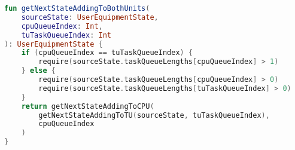 \begin{latin}
	\begin{lstlisting}[language=Kotlin, title=\rl{تابع انتقال حالت با کنش اجرا و ارسال به طور همزمان}]
fun getNextStateAddingToBothUnits(
    sourceState: UserEquipmentState,
    cpuQueueIndex: Int,
    tuTaskQueueIndex: Int
): UserEquipmentState {
	if (cpuQueueIndex == tuTaskQueueIndex) {
		require(sourceState.taskQueueLengths[cpuQueueIndex] > 1)
	} else {
		require(sourceState.taskQueueLengths[cpuQueueIndex] > 0)
		require(sourceState.taskQueueLengths[tuTaskQueueIndex] > 0)
	}
	return getNextStateAddingToCPU(
	    getNextStateAddingToTU(sourceState, tuTaskQueueIndex),
	    cpuQueueIndex
	)
}
	\end{lstlisting}
\end{latin}


\clearpage